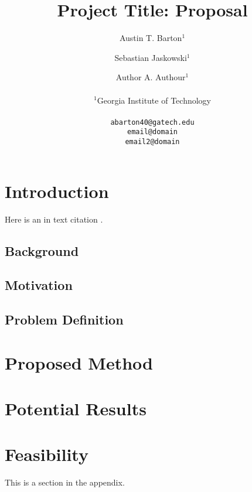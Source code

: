 \documentclass[11pt]{article}
\title{Project Title: Proposal}
\author{Austin T. Barton$^1$ \and Sebastian Jaskowski$^1$ \and Author A. Authour$^1$ \\
        \\
         $^1$Georgia Institute of Technology \\ 
         \\ 
         \texttt{abarton40@gatech.edu} \\ \texttt{email@domain} \\ \texttt{email2@domain}}
\begin{document}
\maketitle

\section{Introduction}
Here is an in text citation \cite{gu2022}.

\subsection{Background}

\subsection{Motivation}

\subsection{Problem Definition}

\section{Proposed Method}

\section{Potential Results}

\section{Feasibility}




This is a section in the appendix.
\end{document}
